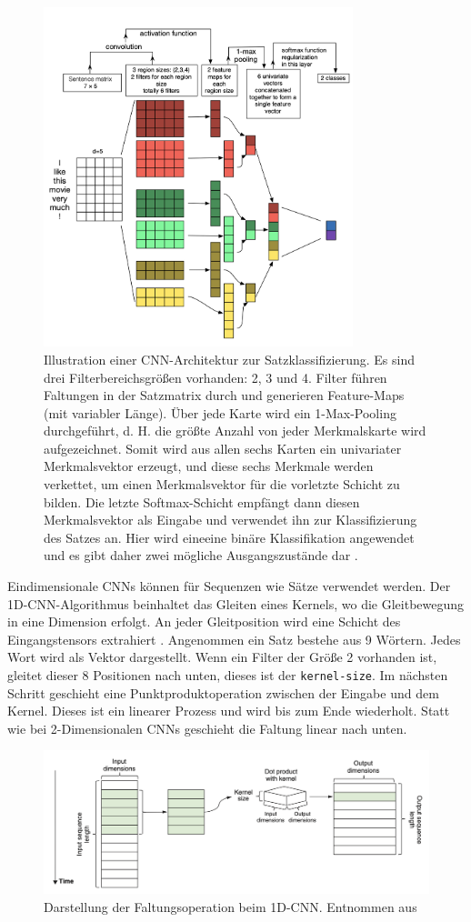 \begin{figure}[H]
    \centering
    \includegraphics[width=9cm]{kapitel2/cnnnlp.png}
    \caption[CNN in der Textverarbeitung]{Illustration einer CNN-Architektur zur Satzklassifizierung. Es sind drei Filterbereichsgrößen vorhanden: 2, 3 und 4. Filter führen Faltungen in der Satzmatrix durch und generieren Feature-Maps (mit variabler Länge). Über jede Karte wird ein 1-Max-Pooling durchgeführt, d. H. die größte Anzahl von jeder Merkmalskarte wird aufgezeichnet. Somit wird aus allen sechs Karten ein univariater Merkmalsvektor erzeugt, und diese sechs Merkmale werden verkettet, um einen Merkmalsvektor für die vorletzte Schicht zu bilden. Die letzte Softmax-Schicht empfängt dann diesen Merkmalsvektor als Eingabe und verwendet ihn zur Klassifizierung des Satzes an. Hier wird eineeine binäre Klassifikation angewendet und es gibt daher zwei mögliche Ausgangszustände dar \cite*{Zhang}.}
    \label{Kap2:Pooling}
\end{figure}

Eindimensionale CNNs können für Sequenzen wie Sätze verwendet werden. Der 1D-CNN-Algorithmus beinhaltet das Gleiten eines Kernels, wo die Gleitbewegung in eine Dimension erfolgt. An jeder Gleitposition wird eine Schicht des Eingangstensors extrahiert \cite[312-313]{cai2020deep}. Angenommen ein Satz bestehe aus 9 Wörtern. Jedes Wort wird als Vektor dargestellt. Wenn ein Filter der Größe 2 vorhanden ist, gleitet dieser 8 Positionen nach unten, dieses ist der \texttt{kernel-size}. Im nächsten Schritt geschieht eine Punktproduktoperation zwischen der Eingabe und dem Kernel. Dieses ist ein linearer Prozess und wird bis zum Ende wiederholt. Statt wie bei 2-Dimensionalen CNNs geschieht die Faltung linear nach unten. 


\begin{figure}[H]
    \centering
    \includegraphics[width=13cm]{kapitel3/1dcn.png}
    \caption[1-Dimensionale CNN]{Darstellung der Faltungsoperation beim 1D-CNN. Entnommen aus \cite[313]{cai2020deep}}
    \label{1dcnn}
\end{figure}